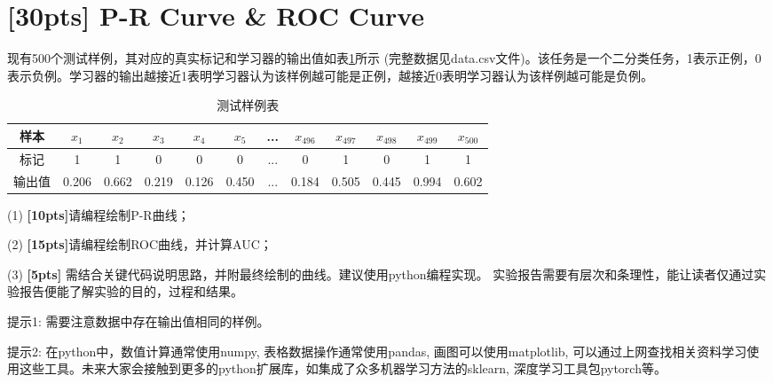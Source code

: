 \documentclass[a4paper,UTF8]{article}
\theoremstyle{definition}
\begin{document}
\section{[30pts] P-R Curve \& ROC Curve}
现有500个测试样例，其对应的真实标记和学习器的输出值如表\ref{table:roc}所示 (完整数据见data.csv文件)。该任务是一个二分类任务，1表示正例，0表示负例。学习器的输出越接近1表明学习器认为该样例越可能是正例，越接近0表明学习器认为该样例越可能是负例。
\begin{table}[!h]
	\centering
	\caption{测试样例表} \vspace{2mm}\label{table:roc}
	\begin{tabular}{c|c c c c c c c c c c c}\hline
		样本   & $x_1$ & $x_2$ & $x_3$ & $x_4$ & $x_5$ & ... & $x_{496}$ & $x_{497}$ & $x_{498}$ & $x_{499}$ & $x_{500}$ \\
		\hline
		标记   & 1     & 1     & 0     & 0     & 0     & ... & 0         & 1         & 0         & 1         & 1         \\
		\hline
		输出值 & 0.206 & 0.662 & 0.219 & 0.126 & 0.450 & ... & 0.184     & 0.505     & 0.445     & 0.994     & 0.602     \\
		\hline
	\end{tabular}
\end{table}

(1) \textbf{[10pts]}请编程绘制P-R曲线；

(2) \textbf{[15pts]}请编程绘制ROC曲线，并计算AUC；

(3)	 \textbf{[5pts]} 需结合关键代码说明思路，并附最终绘制的曲线。建议使用python编程实现。
实验报告需要有层次和条理性，能让读者仅通过实验报告便能了解实验的目的，过程和结果。



提示1: 需要注意数据中存在输出值相同的样例。

提示2: 在python中，数值计算通常使用numpy, 表格数据操作通常使用pandas, 画图可以使用matplotlib, 可以通过上网查找相关资料学习使用这些工具。未来大家会接触到更多的python扩展库，如集成了众多机器学习方法的sklearn, 深度学习工具包pytorch等。
\end{document}
